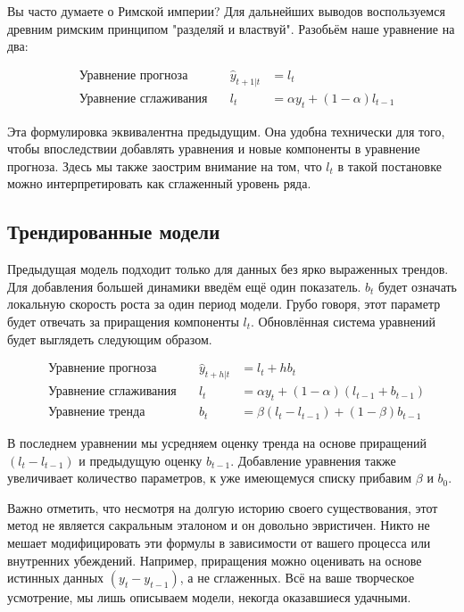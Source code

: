 \documentclass[12pt,fleqn]{article}
\begin{document}
Вы часто думаете о Римской империи? Для дальнейших выводов воспользуемся древним римским принципом "разделяй и властвуй". Разобьём наше уравнение на два:

\begin{equation}
\begin{array}{llll}
	&\text{Уравнение прогноза} \quad & 	\hat{y}_{t+1|t}& = l_t \\
	&\text{Уравнение сглаживания}\quad & l_t& =\alpha y_t +(1-\alpha) l_{t-1}
\end{array}
\end{equation}

Эта формулировка эквивалентна предыдущим. Она удобна технически для того, чтобы впоследствии добавлять уравнения и новые компоненты в уравнение прогноза. Здесь мы также заострим внимание на том, что $l_t$ в такой постановке можно интерпретировать как сглаженный уровень ряда.



\subsection{Трендированные модели}

Предыдущая модель подходит только для данных без ярко выраженных трендов.
Для добавления большей динамики введём ещё один показатель.
$b_t$ будет означать локальную скорость роста за один период модели.
Грубо говоря, этот параметр будет отвечать за приращения компоненты $l_t$. Обновлённая система уравнений будет выглядеть следующим образом.

\begin{equation}
\begin{array}{llll}
		&\text{Уравнение прогноза} \quad & 	\hat{y}_{t+h|t}& = l_t + h b_t \\
		&\text{Уравнение сглаживания}\quad & l_t& =\alpha y_t +(1-\alpha)(l_{t-1} + b_{t-1}) \\
		&\text{Уравнение тренда}\quad & b_t& =\beta (l_t - l_{t-1}) +(1-\beta) b_{t-1}
\end{array}
\end{equation}

В последнем уравнении мы усредняем оценку тренда на основе приращений $(l_t - l_{t-1})$ и предыдущую оценку $b_{t-1}$. Добавление уравнения также увеличивает количество параметров, к уже имеющемуся списку прибавим $\beta$ и $b_0$.

Важно отметить, что несмотря на долгую историю своего существования, этот метод не является сакральным эталоном и он довольно эвристичен. 
Никто не мешает модифицировать эти формулы в зависимости от вашего процесса или внутренних убеждений. 
Например, приращения можно оценивать на основе истинных данных $(y_t - y_{t-1})$, а не сглаженных. 
Всё на ваше творческое усмотрение, мы лишь описываем модели, некогда оказавшиеся удачными.
\end{document}
